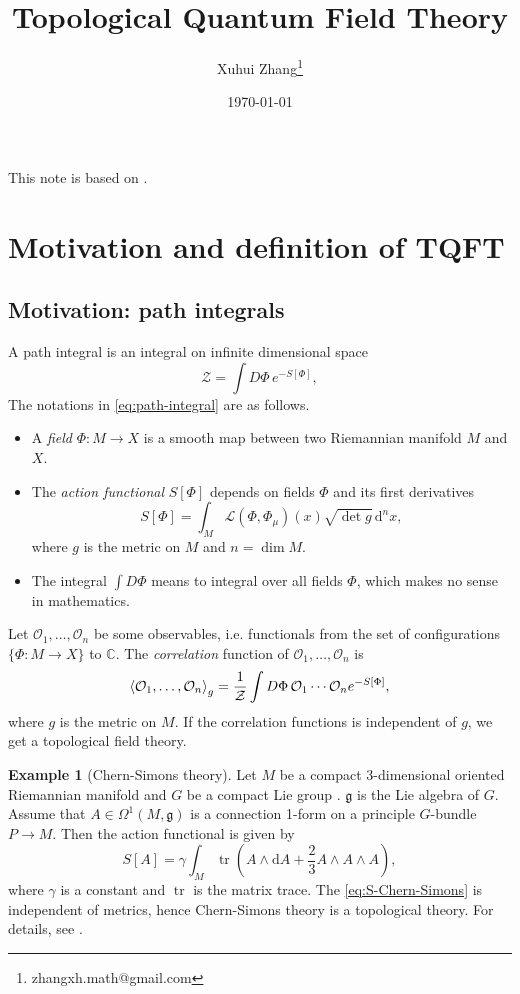 \documentclass[10pt,reqno,final]{article}
\title{Topological Quantum Field Theory}
\author[1]{Xuhui Zhang\thanks{zhangxh.math@gmail.com}}
\affil[1]{Department of Mathematical Science, Tsinghua University}
\date{\today}
\numberwithin{equation}{section}
\numberwithin{figure}{section}
\numberwithin{table}{section}
\theoremstyle{plain}
\theoremstyle{definition}
\newtheorem{example}[theorem]{Example}
\theoremstyle{remark}
\begin{document}
    \maketitle
    This note is based on \cite{carquevilleIntroductoryLecturesTopological2018}. 
    \section{Motivation and definition of TQFT}
    \subsection{Motivation: path integrals}\label{SSS:path-integral}
    A path integral is an integral on infinite dimensional space
    \begin{equation}\label{eq:path-integral}
        \mathcal{Z}=\int D\Phi\, e^{-S[\Phi]},
    \end{equation}
    The notations in \eqref{eq:path-integral} are as follows.
    \begin{itemize}
        \item A \emph{field} \(\Phi:M\to X\) is a smooth map between two Riemannian manifold \(M\) and \(X\). 
        \item The \emph{action functional} \(S[\Phi]\) depends on fields \(\Phi\) and its first derivatives \[
            S[\Phi]=\int_{M}\mathcal{L}(\Phi,\Phi_{\mu})(x)\sqrt{\det g }\,\mathrm{d}^{n }x ,
        \]
        where \(g \) is the metric on \(M \) and \(n=\dim M \).
        \item The integral \(\int D\Phi\) means to integral over all fields \(\Phi \), which makes no sense in mathematics. 
    \end{itemize}

    Let \(\mathcal{O}_{1},\ldots,\mathcal{O}_{n } \) be some observables, i.e. functionals from the set of configurations \(\{ \Phi:M \to X  \}\) to \(\mathbb{C}\). The \emph{correlation} function of \(\mathcal{O}_{1},\ldots,\mathcal{O}_{n } \) is 
    \[
        \braket{\mathcal{O}_{1},\ldots,\mathcal{O}_{n} }_{g}= \frac{1}{\mathcal{Z}}\int D\Phi\, \mathcal{O}_{1}\cdots  \mathcal{O}_{n} e^{-S[\Phi]},
    \]
    where \(g\) is the metric on \(M\). If the correlation functions is independent of \(g\), we get a topological field theory.

    \begin{example}[Chern-Simons theory]
      Let \(M\) be a compact 3-dimensional oriented Riemannian manifold and \(G\) be a compact Lie group . \(\mathfrak{g}\) is the Lie algebra of \(G\). Assume that \(A\in \Omega^{1}(M,\mathfrak{g})\) is a connection 1-form on a principle \(G\)-bundle \(P\to M \). Then the action functional is given by 
      \begin{equation}\label{eq:S-Chern-Simons}
        S[A]=\gamma\int_{M }\operatorname{tr}\left( A\wedge \mathrm{d}A+ \frac{2}{3}A\wedge A\wedge A \right) ,
      \end{equation}
      where \(\gamma\) is a constant and \(\operatorname{tr}\) is the matrix trace. The \eqref{eq:S-Chern-Simons} is independent of metrics, hence Chern-Simons theory is a topological theory. For details, see \cite{wittenQuantumFieldTheory1989}. 
    \end{example}
\end{document}
